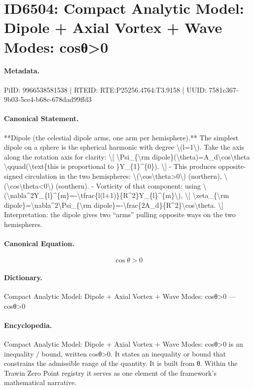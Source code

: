 \section*{ID6504: Compact Analytic Model: Dipole + Axial Vortex + Wave Modes: cosθ>0}
\paragraph{Metadata.}
PiID: 9966538581538 | RTEID: RTE:P25256.4764:T3.9158 | UUID: 7581c367-9b03-5ce4-b68c-678dad99ffd3

\paragraph{Canonical Statement.}
**Dipole (the celestial dipole arms, one arm per hemisphere).** The simplest dipole on a sphere is the spherical harmonic with degree \textbackslash{}(l=1\textbackslash{}). Take the axis along the rotation axis for clarity: \textbackslash{}[ \textbackslash{}Psi\_\{\textbackslash{}rm dipole\}(\textbackslash{}theta)=A\_d\textbackslash{}cos\textbackslash{}theta \textbackslash{}qquad(\textbackslash{}text\{this is proportional to \}Y\_\{1\}\textasciicircum{}\{0\}). \textbackslash{}] - This produces opposite-signed circulation in the two hemispheres: \textbackslash{}(\textbackslash{}cos\textbackslash{}theta>0\textbackslash{}) (northern), \textbackslash{}(\textbackslash{}cos\textbackslash{}theta<0\textbackslash{}) (southern). - Vorticity of that component: using \textbackslash{}(\textbackslash{}nabla\textasciicircum{}2Y\_\{l\}\textasciicircum{}\{m\}=-\textbackslash{}tfrac\{l(l+1)\}\{R\textasciicircum{}2\}Y\_\{l\}\textasciicircum{}\{m\}\textbackslash{}), \textbackslash{}[ \textbackslash{}zeta\_\{\textbackslash{}rm dipole\}=\textbackslash{}nabla\textasciicircum{}2\textbackslash{}Psi\_\{\textbackslash{}rm dipole\}=-\textbackslash{}frac\{2A\_d\}\{R\textasciicircum{}2\}\textbackslash{}cos\textbackslash{}theta. \textbackslash{}] Interpretation: the dipole gives two “arms” pulling opposite ways on the two hemispheres.

\paragraph{Canonical Equation.}
\[
\cos\theta>0
\]

\paragraph{Dictionary.}
Compact Analytic Model: Dipole + Axial Vortex + Wave Modes: cosθ>0 — cosθ>0

\paragraph{Encyclopedia.}
Compact Analytic Model: Dipole + Axial Vortex + Wave Modes: cosθ>0 is an inequality / bound, written cosθ>0. It states an inequality or bound that constrains the admissible range of the quantity. It is built from θ. Within the Trawin Zero Point registry it serves as one element of the framework's mathematical narrative.
